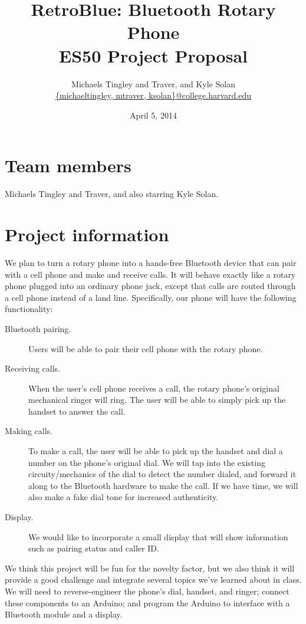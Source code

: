\documentclass[11pt]{article}
\title{RetroBlue: Bluetooth Rotary Phone\\ES50 Project Proposal}
\author{Michaels Tingley and Traver, and Kyle Solan\\\url{{michaeltingley, mtraver, ksolan}@college.harvard.edu}}
\date{April 5, 2014}
\begin{document}
    \maketitle

    \section{Team members}
        Michaels Tingley and Traver, and also starring Kyle Solan.

    \section{Project information}
        We plan to turn a rotary phone into a hands-free Bluetooth device that can pair with a cell phone and make and receive calls. It will behave exactly like a rotary phone plugged into an ordinary phone jack, except that calls are routed through a cell phone instead of a land line. Specifically, our phone will have the following functionality:

        \begin{description}
            \item[Bluetooth pairing.] Users will be able to pair their cell phone with the rotary phone.
            \item[Receiving calls.] When the user's cell phone receives a call, the rotary phone's original mechanical ringer will ring. The user will be able to simply pick up the handset to answer the call.
            \item[Making calls.] To make a call, the user will be able to pick up the handset and dial a number on the phone's original dial. We will tap into the existing circuity/mechanics of the dial to detect the number dialed, and forward it along to the Bluetooth hardware to make the call. If we have time, we will also make a fake dial tone for increased authenticity.
            \item[Display.] We would like to incorporate a small display that will show information such as pairing status and caller ID.
        \end{description}

        We think this project will be fun for the novelty factor, but we also think it will provide a good challenge and integrate several topics we've learned about in class. We will need to reverse-engineer the phone's dial, handset, and ringer; connect these components to an Arduino; and program the Arduino to interface with a Bluetooth module and a display.
\end{document}
